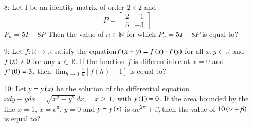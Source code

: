 \documentclass[journal,12pt,twocolumn]{IEEEtran}
\theoremstyle{remark}
\begin{document}
\begin{enumerate}
\item[8:] Let I be an identity matrix of order $2 \times 2$ and 
$$P =\begin{bmatrix}
    2 & -1\\
    5 & -3
\end{bmatrix} $$ 
$P_n = 5I - 8P$ Then the value of $n \in \mathbb{N}$ for which $P_n = 5I - 8P$ is equal to?\vspace{1mm}\\
\item[9:] Let $f : \mathbb{R} \to \mathbb{R}$ satisfy the equation$f\left(x + y\right) = f\left(x\right) \cdot f\left(y\right)$ for all $x, y \in \mathbb{R}$ and $f\left(x\right) \neq 0$ for any $x \in \mathbb{R}$. If the function $f$ is differentiable at $x = 0$ and $f'\left(0\right) = 3$, then $\lim_{h \to 0} \frac{1}{h} [f(h) - 1] $
is equal to?\vspace{1mm}\\
\item[10:] Let $y = y\left(x\right)$ be the solution of the differential equation 
$x dy - y dx = \sqrt{x^2 - y^2} \, dx, \quad x \geq 1,$ with $y\left(1\right) = 0$. If the area bounded by the line $x = 1$, $x = e^\pi$, $y = 0$ and $y = y\left(x\right)$ is $\alpha e^{2\pi} + \beta, $then the value of $10 \left(\alpha + \beta\right)$ is equal to?
\end{enumerate}
\end{document}
